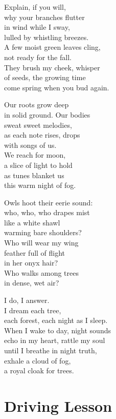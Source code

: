 \documentclass[twoside,10pt]{book}
\begin{document}
Explain, if you will,\\
why your branches flutter\\
in wind while I sway,\\
lulled by whistling breezes.\\
A few moist green leaves cling,\\
not ready for the fall.\\
They brush my cheek, whisper\\
of seeds, the growing time\\
come spring when you bud again.

Our roots grow deep\\
in solid ground. Our bodies\\
sweat sweet melodies,\\
as each note rises, drops\\
with songs of us.\\
We reach for moon,\\
a slice of light to hold\\
as tunes blanket us\\
this warm night of fog.

Owls hoot their eerie sound:\\
who, who, who drapes mist\\
like a white shawl\\
warming bare shoulders?\\
Who will wear my wing\\
feather full of flight\\
in her onyx hair?\\
Who walks among trees\\
in dense, wet air?

I do, I answer.\\
I dream each tree,\\
each forest, each night as I sleep.\\
When I wake to day, night sounds\\
echo in my heart, rattle my soul\\
until I breathe in night truth,\\
exhale a cloud of fog,\\
a royal cloak for trees.


\clearpage
\section{Driving Lesson}
\end{document}
